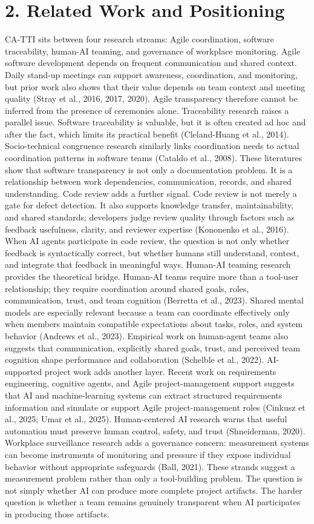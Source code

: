 \documentclass[11pt]{article}
\begin{document}
\section{2. Related Work and Positioning}
CA-TTI sits between four research streams: Agile coordination, software traceability, human-AI teaming, and governance of workplace monitoring.
Agile software development depends on frequent communication and shared context. Daily stand-up meetings can support awareness, coordination, and monitoring, but prior work also shows that their value depends on team context and meeting quality (Stray et al., 2016, 2017, 2020). Agile transparency therefore cannot be inferred from the presence of ceremonies alone.
Traceability research raises a parallel issue. Software traceability is valuable, but it is often created ad hoc and after the fact, which limits its practical benefit (Cleland-Huang et al., 2014). Socio-technical congruence research similarly links coordination needs to actual coordination patterns in software teams (Cataldo et al., 2008). These literatures show that software transparency is not only a documentation problem. It is a relationship between work dependencies, communication, records, and shared understanding.
Code review adds a further signal. Code review is not merely a gate for defect detection. It also supports knowledge transfer, maintainability, and shared standards; developers judge review quality through factors such as feedback usefulness, clarity, and reviewer expertise (Kononenko et al., 2016). When AI agents participate in code review, the question is not only whether feedback is syntactically correct, but whether humans still understand, contest, and integrate that feedback in meaningful ways.
Human-AI teaming research provides the theoretical bridge. Human-AI teams require more than a tool-user relationship; they require coordination around shared goals, roles, communication, trust, and team cognition (Berretta et al., 2023). Shared mental models are especially relevant because a team can coordinate effectively only when members maintain compatible expectations about tasks, roles, and system behavior (Andrews et al., 2023). Empirical work on human-agent teams also suggests that communication, explicitly shared goals, trust, and perceived team cognition shape performance and collaboration (Schelble et al., 2022).
AI-supported project work adds another layer. Recent work on requirements engineering, cognitive agents, and Agile project-management support suggests that AI and machine-learning systems can extract structured requirements information and simulate or support Agile project-management roles (Cinkusz et al., 2025; Umar et al., 2025). Human-centered AI research warns that useful automation must preserve human control, safety, and trust (Shneiderman, 2020). Workplace surveillance research adds a governance concern: measurement systems can become instruments of monitoring and pressure if they expose individual behavior without appropriate safeguards (Ball, 2021).
These strands suggest a measurement problem rather than only a tool-building problem. The question is not simply whether AI can produce more complete project artifacts. The harder question is whether a team remains genuinely transparent when AI participates in producing those artifacts.
\end{document}
